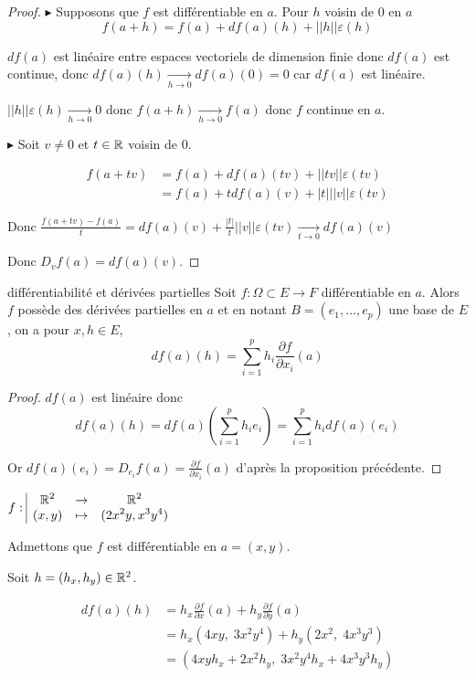 \begin{proof}
    $\blacktriangleright$ Supposons que $f$ est différentiable en $a$. Pour $h$ voisin de $0$ en $a$ 
    $$f(a + h) = f(a) + df(a)(h)+ ||h|| \varepsilon (h)$$

    $df(a)$ est linéaire entre espaces vectoriels de dimension finie donc $df(a)$ est continue, 
    donc $df(a)(h) \xrightarrow[h \to 0]{} df(a)(0) = 0$ car $df(a)$ est linéaire. 

    $||h|| \varepsilon(h) \xrightarrow[h \to 0 ]{} 0$ donc $f(a + h) \xrightarrow[h \to 0 ]{} f(a)$
    donc $f$ continue en $a$. 

    \lvspace 
    
    $\blacktriangleright$ Soit $v \neq 0$ et $t \in \mathbb{R}$ voisin de 0. 

    \begin{align}
        f(a + tv) &= f(a) + df(a)(tv) + ||tv|| \varepsilon (tv) \\
        &= f(a) + t df(a)(v) + |t| ||v|| \varepsilon (tv)
    \end{align}

    Donc  $\displaystyle \frac{f(a + tv) - f(a)}{t} = df(a)(v) + \frac{|t|}{t} ||v|| \varepsilon (tv) \xrightarrow[t \to 0 ]{} df(a)(v)$

    Donc $D_vf(a) = df(a)(v)$.
\end{proof}

\begin{corollaire}{différentiabilité et dérivées partielles}{}
    Soit $f : \Omega \subset E \to F$ différentiable en $a$. Alors $f$ possède des dérivées 
    partielles en $a$ et en notant $B = (e_1, \ldots, e_p)$ une base de $E$, on a pour $x, h \in E$,
    $$df(a)(h) = \sum_{i = 1 }^{p } h_i \frac{\partial f}{\partial x_i} (a)$$
\end{corollaire}

\begin{proof}
    $df(a)$ est linéaire donc 
    $$\displaystyle df(a)(h) = df(a)\left(\sum_{i = 1 }^{p } h_i e_i\right) = \sum_{i = 1 }^{p } h_i df(a)(e_i)$$

    Or $\displaystyle df(a)(e_i) = D_{e_i} f(a) = \frac{\partial f}{\partial x_i} (a)$ d'après la proposition précédente.
\end{proof}

\begin{exemple}
    $f: \space \begin{array}{|ccc} \displaystyle \mathbb{R}^2 & \to & \displaystyle \mathbb{R}^2 \\ \displaystyle (x, y) & \mapsto & \displaystyle (2 x^2y, x^3 y^4) \end{array}$

    Admettons que $f$ est différentiable en $a = (x, y)$. 

    Soit $h = (h_x, h_y) \in \mathbb{R}^2$.

    \begin{align}
        df(a)(h) & = h_x \frac{\partial f}{\partial x} (a) + h_y \frac{\partial f}{\partial y} (a) \\
        & = h_x (4 x y, \; 3 x^2 y^4) + h_y (2 x^2, \; 4 x^3 y^3) \\
        & = (4 x y h_x + 2 x^2 h_y, \; 3 x^2 y^4 h_x + 4 x^3 y^3 h_y)
    \end{align}
\end{exemple}

